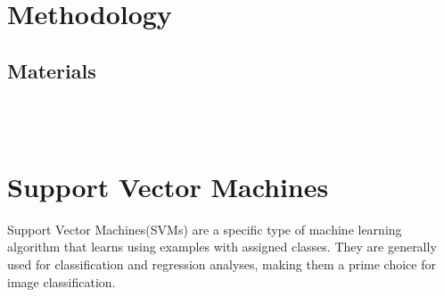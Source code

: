 \documentclass[svgnames]{report}
\begin{document}
\chapter*{Methodology}
        \section*{Materials}
             \\ \\

\chapter*{Support Vector Machines}
    \indent Support Vector Machines(SVMs) are a specific type of machine learning algorithm that learns using examples with assigned classes. They are generally used for classification and regression analyses, making them a prime choice for image classification.
\end{document}
